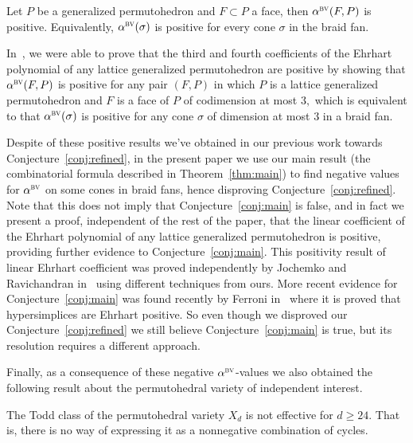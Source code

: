 \documentclass[ALCO,ThmDefs,Unicode,epreuves]{cedram}
\DeclareMathOperator{\ncone}{ncone}
\newcommand{\bv}{\alpha^{\textsc{bv}}}
\begin{document}
\begin{conj}\label{conj:refined}
	Let $P$ be a generalized permutohedron and $F\subset P$ a face, then $\bv(F,P)$ is positive. 
	Equivalently, $\bv(\sigma)$ is positive for every cone $\sigma$ in the braid fan.
\end{conj}

In~\cite{bvalpha}, we were able to prove that the third and fourth coefficients of the Ehrhart polynomial of any lattice generalized permutohedron are positive by showing that $\bv(F,P)$ is positive for any pair $(F,P)$ in which $P$ is a lattice generalized permutohedron and $F$ is a face of $P$ of codimension at most $3,$ which is equivalent to that $\bv(\sigma)$ is positive for any cone $\sigma$ of dimension at most $3$ in a braid fan. 

Despite of these positive results we've obtained in our previous work towards Conjecture~\ref{conj:refined}, in the present paper we use our main result (the combinatorial formula described in Theorem~\ref{thm:main}) to find negative values for $\bv$ on some cones in braid fans, hence disproving Conjecture~\ref{conj:refined}. Note that this does not imply that Conjecture~\ref{conj:main} is false, and in fact we present a proof, independent of the rest of the paper, that the linear coefficient of the Ehrhart polynomial of any lattice generalized permutohedron is positive, providing further evidence to Conjecture~\ref{conj:main}. This positivity result of linear Ehrhart coefficient was proved independently by Jochemko and Ravichandran in~\cite{kat} using different techniques from ours. 
More recent evidence for Conjecture~\ref{conj:main} was found recently by Ferroni in~\cite{hypersimplices} where it is proved that hypersimplices are Ehrhart positive. So even though we disproved our Conjecture~\ref{conj:refined} we still believe Conjecture~\ref{conj:main} is true, but its resolution requires a different approach.

Finally, as a consequence of these negative $\bv$-values we also obtained the following result about the permutohedral variety of independent interest.

\begin{thm}\label{thm:noneffective}
	The Todd class of the permutohedral variety $X_d$ is not effective for $d\geq 24$. That is, there is no way of expressing it as a nonnegative combination of cycles.
\end{thm}
\end{document}
